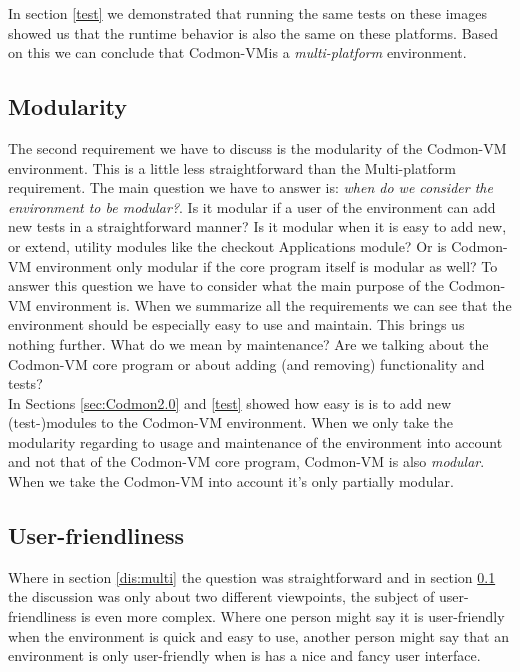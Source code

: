 \documentclass{article}
\newcommand{\project}{Codmon-VM}
\begin{document}
\noindent In section \ref{test} we demonstrated that running the same tests on these images showed us that the runtime behavior is also the same on these platforms. 
Based on this we can conclude that \project is a \emph{multi-platform} environment.\\


\subsection{Modularity}
\label{dis:modular}
The second requirement we have to discuss is the modularity of the \project{} environment. This is a little less straightforward than the Multi-platform requirement. The main question we have to answer is: 
\emph{when do we consider the environment to be modular?}. Is it modular if a user of the environment can add new tests in a straightforward manner? Is it modular when it is easy to add new, or extend, utility 
modules like the checkout Applications module? Or is \project{} environment only modular if the core program itself is modular as well? To answer this question we have to consider what the main purpose of the 
\project{} environment is. When we summarize all the requirements we can see that the environment should be especially easy to use and maintain. This brings us nothing further. What do we mean by 
maintenance? Are we talking about the \project{} core program or about adding (and removing) functionality and tests?\\


\noindent In Sections \ref{sec:Codmon2.0} and \ref{test} showed how easy is is to add new (test-)modules to the \project{} environment. When we only take the modularity regarding to usage and maintenance of the 
environment into account and not that of the \project{} core program, \project{} is also \emph{modular}. When we take the \project{} into account it's only partially modular.\\

\subsection{User-friendliness}
\label{dis:user}
Where in section \ref{dis:multi} the question was straightforward and in section \ref{dis:modular} the discussion was only about two different viewpoints, the subject of user-friendliness is even more complex. 
Where one person might say it is user-friendly when the environment is quick and easy to use, another person might say that an environment is only user-friendly when is has a nice and fancy user interface.\\
\end{document}
